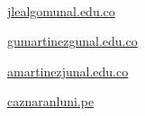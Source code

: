 \begin{frame}
\begin{columns}
\begin{column}{0.5\textwidth}
\begin{flushright}
				\

				\href{mailto:jlealgom@unal.edu.co}{jlealgom\MVAt unal.edu.co}


				\href{mailto:gumartinezg@unal.edu.co}{gumartinezg\MVAt unal.edu.co}

				\href{mailto:amartinezj@unal.edu.co}{amartinezj\MVAt unal.edu.co}

				\href{mailto:caznaranl@uni.pe}{caznaranl\MVAt uni.pe}
			\end{flushright}
		\end{column}
	\end{columns}

\end{frame}